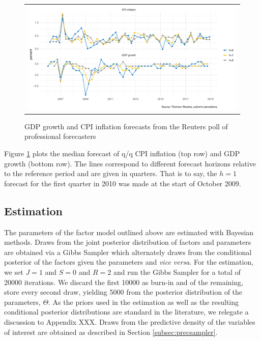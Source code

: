 \documentclass[notitlepage,a4paper,12pt]{article}
\begin{document}
\begin{figure}[htbp] \centering
    \caption{GDP growth and CPI inflation forecasts from the Reuters poll of professional forecasters \label{fig:reuterspoll}}
    \footnotesize
    \begin{tabular}{p{16cm}}
    \multicolumn{1}{c}{\includegraphics*[scale = 0.6]{../figures/fig_ReutersPoll.pdf}} \\
    \end{tabular}
    \newline
    \normalsize
\end{figure}

Figure \ref{fig:reuterspoll} plots the median forecast of q/q CPI inflation (top row) and GDP growth (bottom row). The lines correspond to different forecast horizons relative to the reference period and are given in quarters. That is to say, the $h=1$ forecast for the first quarter in 2010 was made at the start of October 2009. 
 

\subsection{Estimation}

The parameters of the factor model outlined above are estimated with Bayesian methods. Draws from the joint posterior distribution of factors and parameters are obtained via a Gibbs Sampler which alternately draws from the conditional posterior of the factors given the parameters and \textit{vice versa}. For the estimation, we set $J=1$ and $S=0$ and $R=2$ and run the Gibbs Sampler for a total of 20000 iterations. We discard the first 10000 as burn-in and of the remaining, store every second draw, yielding 5000 from the posterior distribution of the parameters, $\Theta$. As the priors used in the estimation as well as the resulting conditional posterior distributions are standard in the literature, we relegate a discussion to Appendix XXX. Draws from the predictive density of the variables of interest are obtained as described in Section \ref{subsec:precsampler}.
\end{document}
